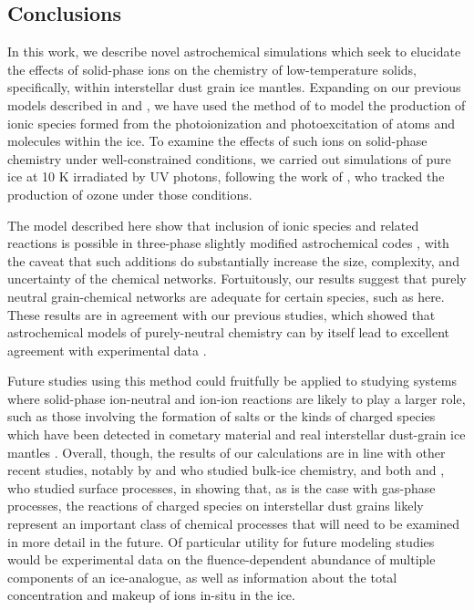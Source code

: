 \documentclass[journal=aesccq,manuscript=article,layout=twocolumn]{achemso}
\begin{document}
\subsection{Conclusions} \label{sec:conclusions}

In this work, we describe novel astrochemical simulations which seek to elucidate the effects of solid-phase ions on the chemistry of low-temperature solids, specifically, within interstellar dust grain ice mantles. Expanding on our previous models described in \citet{shingledecker_simulating_2019} and \citet{mullikin_new_2021}, we have used the method of \citet{shingledecker_general_2018} to model the production of ionic species formed from the photoionization and photoexcitation of atoms and molecules within the ice. To examine the effects of such ions on solid-phase chemistry under well-constrained conditions, we carried out simulations of pure  ice at 10 K irradiated by UV photons, following the work of \citet{gerakines_ultraviolet_1996}, who tracked the production of ozone under those conditions.

The model described here show that inclusion of ionic species and related reactions is possible in three-phase slightly modified astrochemical codes , with the caveat that such additions do substantially increase the size, complexity, and uncertainty of the chemical networks. Fortuitously, our results suggest that purely neutral grain-chemical networks are adequate for certain species, such as  here. These results are in agreement with our previous studies, which showed that astrochemical models of purely-neutral  chemistry can by itself lead to excellent agreement with experimental data \citep{mullikin_condensed-phase_2018,shingledecker_simulating_2019}.

Future studies using this method could fruitfully be applied to studying systems where solid-phase ion-neutral and ion-ion reactions are likely to play a larger role, such as those involving the formation of salts or the kinds of charged species which have been detected in cometary material \citep{altwegg_evidence_2020} and real interstellar dust-grain ice mantles \citep{mcclure_ice_2023,yang_corinos_2022}. Overall, though, the results of our calculations are in line with other recent studies, notably by \citet{woon_ion-ice_2011} and \citet{woon_formation_2024} who studied bulk-ice chemistry, and both \citet{nakai_methanol_2023} and \citet{cui_exploring_2024}, who studied surface processes, in showing that, as is the case with gas-phase processes, the reactions of charged species on interstellar dust grains likely represent an important class of chemical processes that will need to be examined in more detail in the future. Of particular utility for future modeling studies would be experimental data on the fluence-dependent abundance of multiple components of an ice-analogue, as well as information about the total concentration and makeup of ions in-situ in the ice. 
\end{document}
